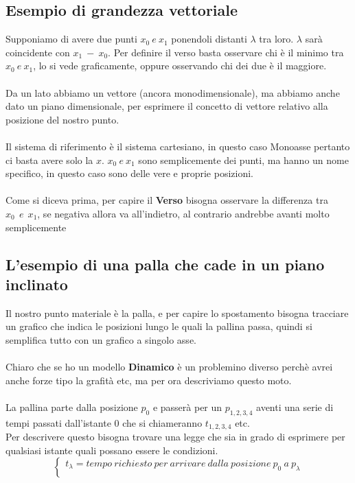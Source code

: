 \documentclass[12pt, a4paper, openany, oneside]{book}
\begin{document}
\subsection{Esempio di grandezza vettoriale}
Supponiamo di avere due punti $x_{0} ~ e ~ x_{1}$ ponendoli distanti $\lambda$ tra 
loro. $\lambda$ sarà coincidente con $x_{1} ~ - ~ x_{0}$. Per definire il verso
basta osservare chi è il minimo tra $x_{0} ~ e ~ x_{1}$, lo si vede graficamente,
oppure osservando chi dei due è il maggiore. 
\\ \\
Da un lato abbiamo un vettore (ancora monodimensionale), ma abbiamo anche 
dato un piano dimensionale, per esprimere il concetto di vettore relativo alla
posizione del nostro punto.
\\ \\
Il sistema di riferimento è il sistema cartesiano, in questo caso Monoasse 
pertanto ci basta avere solo la $x$. $x_{0} ~ e ~ x_{1}$ sono semplicemente dei 
punti, ma hanno un nome specifico, in questo caso sono delle vere e proprie
posizioni.
\\ \\
Come si diceva prima, per capire il \textbf{Verso} bisogna osservare la differenza
tra $x_{0}  ~~ e  ~~ x_{1}$, se negativa allora va all'indietro, al contrario andrebbe 
avanti molto semplicemente
\subsection{L'esempio di una palla che cade in un piano inclinato}
Il nostro punto materiale è la palla, e per capire lo spostamento bisogna
tracciare un grafico che indica le posizioni lungo le quali la pallina passa,
quindi si semplifica tutto con un grafico a singolo asse.
\\ \\
Chiaro che se ho un modello \textbf{Dinamico} è un problemino diverso perchè
avrei anche forze tipo la grafità etc, ma per ora descriviamo questo moto.
\\ \\
La pallina parte dalla posizione $p_{0}$ e passerà per un $p_{1,2,3,4}$ aventi
una serie di tempi passati dall'istante 0 che si chiameranno $t_{1,2,3,4}$ etc.
\\
Per descrivere questo bisogna trovare una legge che sia in grado di esprimere
per qualsiasi istante quali possano essere le condizioni. 
\[
\begin{cases}
t_{\lambda} = tempo ~ richiesto ~ per ~ arrivare ~ dalla ~ posizione ~ p_{0} ~ a
~ p_{\lambda}  \\
\end{cases}
\]
\end{document}
